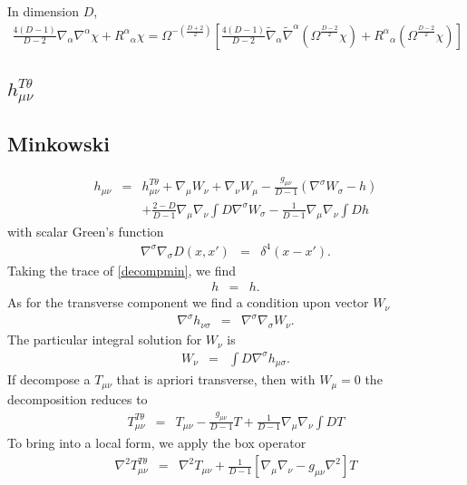 \documentclass[10pt,letterpaper]{article}
\numberwithin{equation}{section}
\begin{document}
In dimension $D$,
\begin{eqnarray}
\frac{4(D-1)}{D-2} \nabla_\alpha\nabla^\alpha \chi + R^\alpha{}_\alpha \chi
= \Omega^{-\left(\frac{D+2}{2}\right)}\left[
\frac{4(D-1)}{D-2}\tilde\nabla_\alpha\tilde\nabla^\alpha \left( \Omega^{\frac{D-2}{2}}\chi\right)
+R^\alpha{}_\alpha \left( \Omega^{\frac{D-2}{2}}\chi\right)
\right]
\end{eqnarray}
\newpage
\begin{appendices}
%
%
%
\section{$h_{\mu\nu}^{T\theta}$}

\subsection{Minkowski}
\begin{eqnarray}
h_{\mu\nu} &=& h_{\mu\nu}^{T\theta} + \nabla_\mu W_\nu + \nabla_\nu W_\mu - \frac{g_{\mu\nu}}{D-1}(\nabla^\sigma W_\sigma - h)
\nonumber\\
&& +\frac{2-D}{D-1} \nabla_\mu\nabla_\nu  \int D \nabla^\sigma W_\sigma
-\frac{1}{D-1}\nabla_\mu\nabla_\nu  \int D h
\label{decompmin}
\end{eqnarray}
with scalar Green's function
\begin{eqnarray}
 \nabla^\sigma \nabla_\sigma D(x,x') &=& \delta^4(x-x').
\end{eqnarray}
Taking the trace of \eqref{decompmin}, we find
\begin{eqnarray}
h &=& h.
\end{eqnarray}
As for the transverse component we find  a condition upon vector $W_\nu$
\begin{eqnarray}
\nabla^\sigma h_{\nu\sigma}&=& \nabla^\sigma\nabla_\sigma W_\nu.
\end{eqnarray}
The particular integral solution for $W_\nu$ is
\begin{eqnarray}
W_\nu &=& \int D \nabla^\sigma h_{\mu\sigma}.
\end{eqnarray}
If decompose a $T_{\mu\nu}$ that is apriori transverse, then with $W_\mu =0$ the decomposition reduces to
\begin{eqnarray}
T^{T\theta}_{\mu\nu} &=& T_{\mu\nu} - \frac{g_{\mu\nu}}{D-1}T + \frac{1}{D-1}\nabla_\mu\nabla_\nu \int D T
\label{consmin}
\end{eqnarray}
To bring into a local form, we apply the box operator
\begin{eqnarray}
\nabla^2 T^{T\theta}_{\mu\nu} &=& \nabla^2 T_{\mu\nu} + \frac{1}{D-1}\left[ 
\nabla_\mu\nabla_\nu - g_{\mu\nu}\nabla^2\right]T
\label{boxconsmin}
\end{eqnarray}
%
%
%



\end{appendices}
\end{document}
